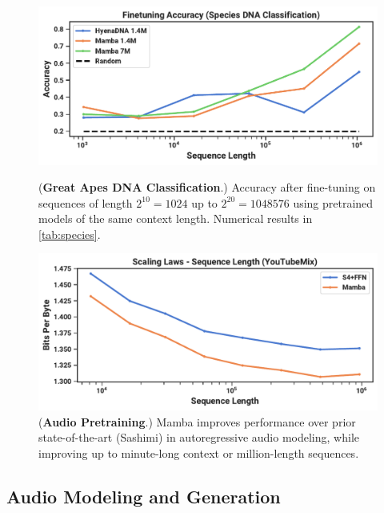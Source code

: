 \begin{figure}[!ht]
  \begin{minipage}[t]{.49\linewidth}
    \centering
    \includegraphics[width=\linewidth]{fig/species.pdf}
    \captionsetup{type=figure}
    \caption{
      (\textbf{Great Apes DNA Classification}.)
      Accuracy after fine-tuning on sequences of length $2^{10}=1024$ up to $2^{20}=1048576$ using pretrained models of the same context length.
      Numerical results in \cref{tab:species}.
    }
    \label{fig:species}
  \end{minipage}
  \hfill
  \begin{minipage}[t]{.49\linewidth}
    \centering
    \includegraphics[width=\linewidth]{fig/youtubemix.pdf}
    \captionsetup{type=figure}
    \caption{
      (\textbf{Audio Pretraining}.) Mamba improves performance over prior state-of-the-art (Sashimi) in autoregressive audio modeling, while improving up to minute-long context or million-length sequences\iftoggle{arxiv}{ (controlling for computation)}{}.
    }
    \label{fig:youtubemix}
  \end{minipage}
\end{figure}


\subsection{Audio Modeling and Generation}
\label{sec:exp:audio}

